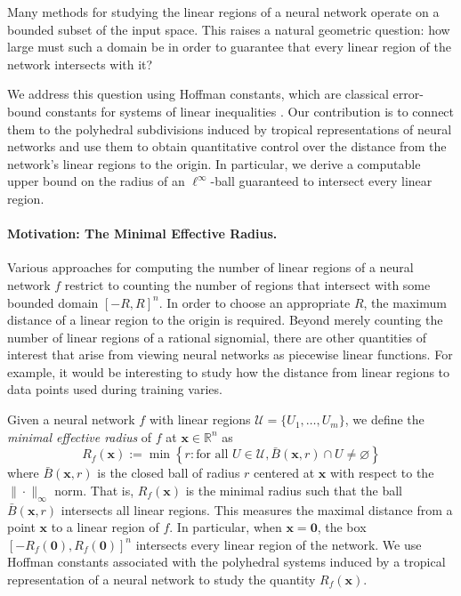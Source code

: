 \documentclass[10pt]{article}
\theoremstyle{definition}
\theoremstyle{remark}
\newcommand{\RR}{{\mathbb{R}}}
\renewcommand{\vec}[1]{\mathbf{#1}}
\def\vx{{\vec{x}}}
\begin{document}
Many methods for studying the linear regions of a neural network operate on a bounded subset of the input space. This raises a natural geometric question: how large must such a domain be in order to guarantee that every linear region of the network intersects with it?

We address this question using Hoffman constants, which are classical error-bound constants for systems of linear inequalities \citep{hoffman1952approximate}. Our contribution is to connect them to the polyhedral subdivisions induced by tropical representations of neural networks and use them to obtain quantitative control over the distance from the network's linear regions to the origin. In particular, we derive a computable upper bound on the radius of an $\ell^\infty$-ball guaranteed to intersect every linear region.

\paragraph{Motivation: The Minimal Effective Radius.}

Various approaches for computing the number of linear regions of a neural network $f$ restrict to counting the number of regions that intersect with some bounded domain $[-R, R]^n$. In order to choose an appropriate $R$, the maximum distance of a linear region to the origin is required.
Beyond merely counting the number of linear regions of a rational signomial, there are other quantities of interest that arise from viewing neural networks as piecewise linear functions. For example, it would be interesting to study how the distance from linear regions to data points used during training varies.

Given a neural network $f$ with linear regions $\mathcal{U} = \{U_1,\ldots,U_m\}$, we define the \emph{minimal effective radius} of $f$ at $\vx \in \RR^n$ as
$$
R_f(\vx):=\min\left\{r: \text{for all } U\in\mathcal{U}
, \bar{B}(\vx,r)\cap U \neq \varnothing\right\}
$$
where $\bar{B}(\vx,r)$ is the closed ball of radius $r$ centered at $\vx$ with respect to the $\| \cdot \|_\infty$ norm. That is, $R_f(\vx)$ is the minimal radius such that the ball $\bar{B}(\vx,r)$ intersects all linear regions. This measures the maximal distance from a point $\vx$ to a linear region of $f$. In particular, when $\vx=\mathbf 0$,
the box $[-R_f(\mathbf 0),R_f(\mathbf 0)]^n$ intersects every linear region of the network. We use Hoffman constants associated with the polyhedral systems induced
by a tropical representation of a neural network to study the quantity
$R_f(\vx)$.
\end{document}
